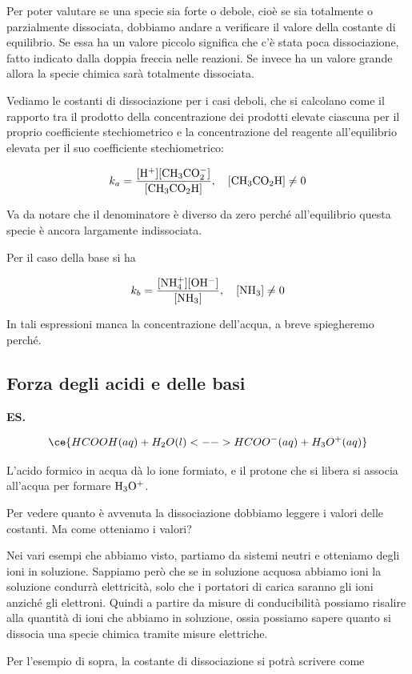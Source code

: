 Per poter valutare se una specie sia forte o debole, cioè se sia totalmente o parzialmente dissociata, dobbiamo andare a verificare il valore della costante di equilibrio. Se essa ha un valore piccolo significa che c'è stata poca dissociazione, fatto indicato dalla doppia freccia nelle reazioni. Se invece ha un valore grande allora la specie chimica sarà totalmente dissociata.

\vspace{0.2cm}Vediamo le costanti di dissociazione per i casi deboli, che si calcolano come il rapporto tra il prodotto della concentrazione dei prodotti elevate ciascuna per il proprio coefficiente stechiometrico e la concentrazione del reagente all'equilibrio elevata per il suo coefficiente stechiometrico:

$$k_a=\rm{\frac{[H^+][CH_3CO_2^-]}{[CH_3CO_2H]}}, \quad [CH_3CO_2H] \neq 0$$

Va da notare che il denominatore è diverso da zero perché all'equilibrio questa specie è ancora largamente indissociata.

Per il caso della base si ha

$$k_b=\rm{\frac{[NH_4^+][OH^-]}{[NH_3]}}, \quad [NH_3]\neq 0$$

In tali espressioni manca la concentrazione dell'acqua, a breve spiegheremo perché.
\subsection{Forza degli acidi e delle basi}
\textbf{ES.}

$$\ce{HCOOH(aq) + H_2O(l) <--> HCOO^-(aq) + H_3O^+(aq)}$$

L'acido formico in acqua dà lo ione formiato, e il protone che si libera si associa all'acqua per formare $\rm H_3O^+$.

Per vedere quanto è avvenuta la dissociazione dobbiamo leggere i valori delle costanti. Ma come otteniamo i valori?

Nei vari esempi che abbiamo visto, partiamo da sistemi neutri e otteniamo degli ioni in soluzione. Sappiamo però che se in soluzione acquosa abbiamo ioni la soluzione condurrà elettricità, solo che i portatori di carica saranno gli ioni anziché gli elettroni. Quindi a partire da misure di conducibilità possiamo risalire alla quantità di ioni che abbiamo in soluzione, ossia possiamo sapere quanto si dissocia una specie chimica tramite misure elettriche.

Per l'esempio di sopra, la costante di dissociazione si potrà scrivere come

